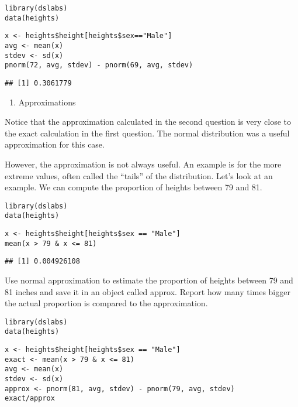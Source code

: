 \documentclass[]{article}
\providecommand{\tightlist}{%
  \setlength{\itemsep}{0pt}\setlength{\parskip}{0pt}}
\begin{document}
\begin{verbatim}
library(dslabs)
data(heights)
\end{verbatim}

\begin{verbatim}
x <- heights$height[heights$sex=="Male"]
avg <- mean(x)
stdev <- sd(x)
pnorm(72, avg, stdev) - pnorm(69, avg, stdev)
\end{verbatim}

\begin{verbatim}
## [1] 0.3061779
\end{verbatim}

\begin{enumerate}
\def\labelenumi{\arabic{enumi}.}
\setcounter{enumi}{2}
\tightlist
\item
  Approximations
\end{enumerate}

Notice that the approximation calculated in the second question is very
close to the exact calculation in the first question. The normal
distribution was a useful approximation for this case.

However, the approximation is not always useful. An example is for the
more extreme values, often called the ``tails'' of the distribution.
Let's look at an example. We can compute the proportion of heights
between 79 and 81.

\begin{verbatim}
library(dslabs)  
data(heights)  
\end{verbatim}

\begin{verbatim}
x <- heights$height[heights$sex == "Male"]  
mean(x > 79 & x <= 81)  
\end{verbatim}

\begin{verbatim}
## [1] 0.004926108
\end{verbatim}

Use normal approximation to estimate the proportion of heights between
79 and 81 inches and save it in an object called approx. Report how many
times bigger the actual proportion is compared to the approximation.

\begin{verbatim}
library(dslabs)
data(heights)
\end{verbatim}

\begin{verbatim}
x <- heights$height[heights$sex == "Male"]
exact <- mean(x > 79 & x <= 81)
avg <- mean(x)
stdev <- sd(x)
approx <- pnorm(81, avg, stdev) - pnorm(79, avg, stdev)
exact/approx
\end{verbatim}
\end{document}
